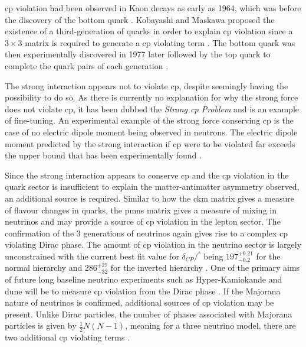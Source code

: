 \gls{cp} violation had been observed in Kaon decays as early as 1964, which was before the discovery of the bottom quark \cite{Cronin_and_Fitch_experiment}. Kobayashi and Maskawa proposed the existence of a third-generation of quarks in order to explain \gls{cp} violation since a $3\times3$ matrix is required to generate a \gls{cp} violating term \cite{CP_Violation_in_the_Renormalizable_Theory_of_Weak_Interaction}. The bottom quark was then experimentally discovered in 1977 later followed by the top quark to complete the quark pairs of each generation \cite{bottom_quark_discovery}. 

The strong interaction appears not to violate \gls{cp}, despite seemingly having the possibility to do so. As there is currently no explanation for why the strong force does not violate \gls{cp}, it has been dubbed the \textit{Strong \gls{cp} Problem} and is an example of fine-tuning. An experimental example of the strong force conserving \gls{cp} is the case of no electric dipole moment being observed in neutrons. The electric dipole moment predicted by the strong interaction if \gls{cp} were to be violated far exceeds the upper bound that has been experimentally found \cite{strong_CP_problem}.

Since the strong interaction appears to conserve \gls{cp} and the \gls{cp} violation in the quark sector is insufficient to explain the matter-antimatter asymmetry observed, an additional source is required. Similar to how the \gls{ckm} matrix gives a measure of flavour changes in quarks, the \gls{pmns} matrix gives a measure of mixing in neutrinos and may provide a source of \gls{cp} violation in the lepton sector. The confirmation of the 3 generations of neutrinos again gives rise to a complex \gls{cp} violating Dirac phase. The amount of \gls{cp} violation in the neutrino sector is largely unconstrained with the current best fit value for $\delta_{CP}/^\circ$ being $197^{+0.21}_{-0.2}$ for the normal hierarchy and $286^{+27}_{-32}$ for the inverted hierarchy \cite{nu_ft_v2}. One of the primary aims of future long baseline neutrino experiments such as Hyper-Kamiokande and \gls{dune} will be to measure \gls{cp} violation from the Dirac phase \cite{Hyper_Kamiokande_design_report}\cite{DUNE_design_report}. If the Majorana nature of neutrinos is confirmed, additional sources of \gls{cp} violation may be present. Unlike Dirac particles, the number of phases associated with Majorana particles is given by $\frac{1}{2}N(N-1)$, meaning for a three neutrino model, there are two additional \gls{cp} violating terms \cite{Majorana_neutrinos_and_other_Majorana_particles_Theory_and_experiment}.


